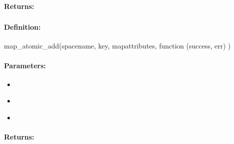 \paragraph{Returns:}


\pagebreak
\subsubsection{}
\label{api:nodejs:map_atomic_add}


\paragraph{Definition:}
\begin{javascriptcode}
map_atomic_add(spacename, key, mapattributes, function (success, err) {})
\end{javascriptcode}
\paragraph{Parameters:}
\begin{itemize}[noitemsep]
\item {}\\

\item {}\\

\item {}\\

\end{itemize}

\paragraph{Returns:}


\pagebreak
\subsubsection{}
\label{api:nodejs:cond_map_atomic_add}


